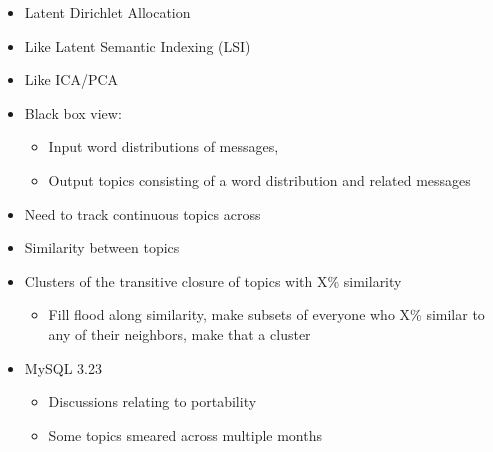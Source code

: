 \documentclass[titlepage,usenames,a4,landscape,semhelv,16pt]{seminar}
\begin{document}
\begin{slide}
\begin{itemize}
\begin{itemize}
\begin{itemize}
\begin{itemize}
		\end{itemize}
	\end{itemize}
\end{itemize}
\end{itemize}
\begin{itemize}
\item Latent Dirichlet Allocation
\item Like Latent Semantic Indexing (LSI)
\item Like ICA/PCA
\item Black box view:
	\begin{itemize}
	\item Input word distributions of messages, 
	\item Output topics consisting of a word distribution and related messages

\end{itemize}
\end{itemize}
\begin{itemize}
\item Need to track continuous topics across 
\item Similarity between topics
\item Clusters of the transitive closure of topics with X\% similarity
	\begin{itemize}
	\item Fill flood along similarity, make subsets of everyone who X\% similar to any of their neighbors, make that a cluster

\newslide




\end{itemize}
\end{itemize}
\begin{itemize}
\item MySQL 3.23 
	\begin{itemize}
	\item Discussions relating to portability
	\item Some topics smeared across multiple months



\end{itemize}
\end{itemize}
\end{slide}
\end{document}
